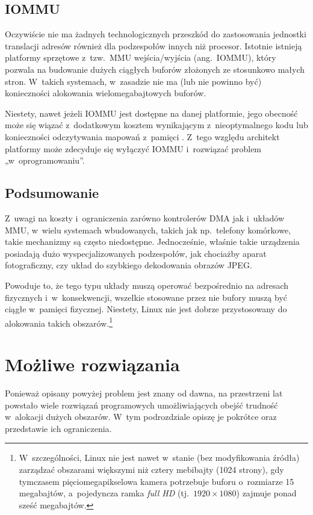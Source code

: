 \subsection{IOMMU}

Oczywiście nie ma żadnych technologicznych przeszkód do zastosowania
jednostki translacji adresów również dla podzespołów innych niż
procesor.  Istotnie istnieją platformy sprzętowe z~tzw.\ MMU
wejścia/wyjścia (ang.\ IOMMU), który pozwala na budowanie dużych
ciągłych buforów złożonych ze stosunkowo małych stron.  W~takich
systemach, w~zasadzie nie ma (lub nie powinno być) konieczności
alokowania wielomegabajtowych buforów.

Niestety, nawet jeżeli IOMMU jest dostępne na danej platformie, jego
obecność może się wiązać z~dodatkowym kosztem wynikającym
z~nieoptymalnego kodu \autocite{bib:price-of-safety} lub konieczności
odczytywania mapowań z~pamięci
\autocite{bib:mitigate-iotlb-bottleneck}.  Z~tego względu architekt
platformy może zdecyduje się wyłączyć IOMMU i~rozwiązać problem
„w~oprogramowaniu”.

\subsection{Podsumowanie}

Z~uwagi na koszty i~ograniczenia zarówno kontrolerów DMA jak i~układów
MMU, w~wielu systemach wbudowanych, takich jak np.\ telefony
komórkowe, takie mechanizmy są często niedostępne.  Jednocześnie,
właśnie takie urządzenia posiadają dużo wyspecjalizowanych
podzespołów, jak chociażby aparat fotograficzny, czy układ do
szybkiego dekodowania obrazów JPEG.

Powoduje to, że tego typu układy muszą operować bezpośrednio na
adresach fizycznych i~w~konsekwencji, wszelkie stosowane przez nie
bufory muszą być ciągłe w~pamięci fizycznej.  Niestety, Linux nie jest
dobrze przystosowany do alokowania takich
obszarów.\footnote{W~szczególności, Linux nie jest nawet w~stanie (bez
  modyfikowania źródła) zarządzać obszarami większymi niż cztery
  mebibajty (1024 strony), gdy tymczasem pięciomegapikselowa kamera
  potrzebuje buforu o~rozmiarze 15 megabajtów, a~pojedyncza ramka {\it
    full HD} (tj.\ $1920 \times 1080$) zajmuje ponad sześć megabajtów.}


\section{Możliwe rozwiązania}

Ponieważ opisany powyżej problem jest znany od dawna, na przestrzeni
lat powstało wiele rozwiązań programowych umożliwiających obejść
trudność w~alokacji dużych obszarów.  W~tym podrozdziale opiszę je
pokrótce oraz przedstawie ich ograniczenia.

